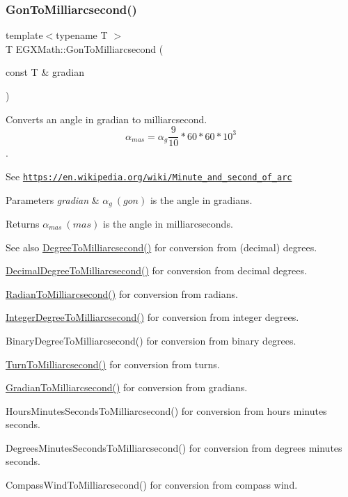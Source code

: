 \subsubsection{\texorpdfstring{Gon\+To\+Milliarcsecond()}{GonToMilliarcsecond()}}
{\footnotesize\ttfamily template$<$typename T $>$ \\
T E\+G\+X\+Math\+::\+Gon\+To\+Milliarcsecond (\begin{DoxyParamCaption}\item[{const T \&}]{gradian }\end{DoxyParamCaption})}



Converts an angle in gradian to milliarcsecond. \[\alpha_{mas}=\alpha_{g}\frac{9}{10} * 60 * 60 * 10^3\]. 

See \href{https://en.wikipedia.org/wiki/Minute_and_second_of_arc}{\tt https\+://en.\+wikipedia.\+org/wiki/\+Minute\+\_\+and\+\_\+second\+\_\+of\+\_\+arc} 
\begin{DoxyParams}{Parameters}
{\em gradian} & $\alpha_{g}\ (gon)$ is the angle in gradians. \\
\hline
\end{DoxyParams}
\begin{DoxyReturn}{Returns}
$\alpha_{mas}\ (mas)$ is the angle in milliarcseconds. 
\end{DoxyReturn}
\begin{DoxySeeAlso}{See also}
\mbox{\hyperlink{group___e_g_x_math-_angle_conversions-_degree_ga2c218e286b2ef72a00734dbc5a7f5ab6}{Degree\+To\+Milliarcsecond()}} for conversion from (decimal) degrees. 

\mbox{\hyperlink{group___e_g_x_math-_angle_conversions-_decimal_degree_gadb9ff3c92cf7484793f91e7de80c222e}{Decimal\+Degree\+To\+Milliarcsecond()}} for conversion from decimal degrees. 

\mbox{\hyperlink{group___e_g_x_math-_angle_conversions-_radian_ga84fbb494a455cfeb30be62776f96c9a9}{Radian\+To\+Milliarcsecond()}} for conversion from radians. 

\mbox{\hyperlink{group___e_g_x_math-_angle_conversions-_integer_degree_gadc43f22e832cd8fcf16b7bd2269ae348}{Integer\+Degree\+To\+Milliarcsecond()}} for conversion from integer degrees. 

Binary\+Degree\+To\+Milliarcsecond() for conversion from binary degrees. 

\mbox{\hyperlink{group___e_g_x_math-_angle_conversions-_turn_ga05d6fea8f8475831e93dd23f6196393f}{Turn\+To\+Milliarcsecond()}} for conversion from turns. 

\mbox{\hyperlink{group___e_g_x_math-_angle_conversions-_gradian_gad77ea0956413029f4166dce8d7f5ce83}{Gradian\+To\+Milliarcsecond()}} for conversion from gradians. 

Hours\+Minutes\+Seconds\+To\+Milliarcsecond() for conversion from hours minutes seconds. 

Degrees\+Minutes\+Seconds\+To\+Milliarcsecond() for conversion from degrees minutes seconds. 

Compass\+Wind\+To\+Milliarcsecond() for conversion from compass wind. 
\end{DoxySeeAlso}
